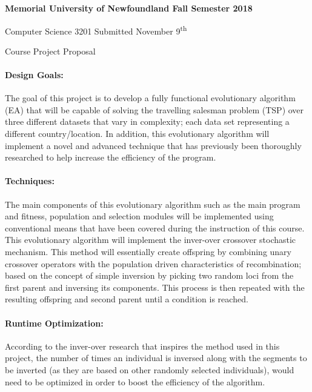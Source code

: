 	{
		\parindent=0pt
		\bfseries
		Memorial University of Newfoundland \hfill Fall Semester 2018 
		
		Computer Science 3201 \hfill Submitted November 9\textsuperscript{th}
		
		\vskip 2pc
		
		{
			\Large \hfill Course Project Proposal \hfill
		}
	}
	
	\paragraph{Design Goals:} The goal of this project is to develop a fully functional evolutionary algorithm (EA) that will be capable of solving the travelling salesman problem (TSP) over three different datasets that vary in complexity; each data set representing a different country/location. In addition, this evolutionary algorithm will implement a novel and advanced technique that has previously been thoroughly researched to help increase the efficiency of the program.
	
	\paragraph{Techniques:} The main components of this evolutionary algorithm such as the main program and fitness, population and selection modules will be implemented using conventional means that have been covered during the instruction of this course. This evolutionary algorithm will implement the inver-over crossover stochastic mechanism. This method will essentially create offspring by combining unary crossover operators with the population driven characteristics of recombination\cite{art5}; based on the concept of simple inversion by picking two random loci from the first parent and inversing its components\cite{art7}. This process is then repeated with the resulting offspring and second parent until a condition is reached.
	
	\paragraph{Runtime Optimization:} According to the inver-over research that inspires the method used in this project, the number of times an individual is inversed along with the segments to be inverted (as they are based on other randomly selected individuals), would need to be optimized in order to boost the efficiency of the algorithm. 
	
